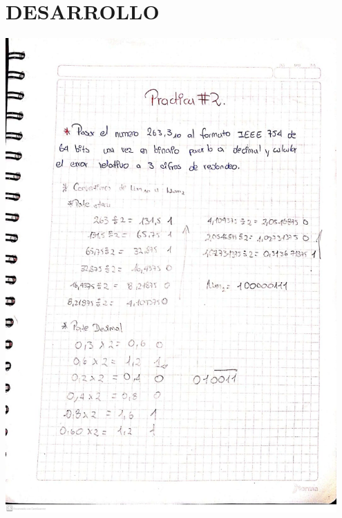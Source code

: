 \documentclass[12pt]{article}
\begin{document}
\section*{DESARROLLO}
\begin{minipage}{0.95\textwidth}
    \raggedleft
    \includegraphics[width=0.95\textwidth]{inFiles/Figures/ej3.jpeg}
\end{minipage}

\vspace{0.5cm}
\end{document}
